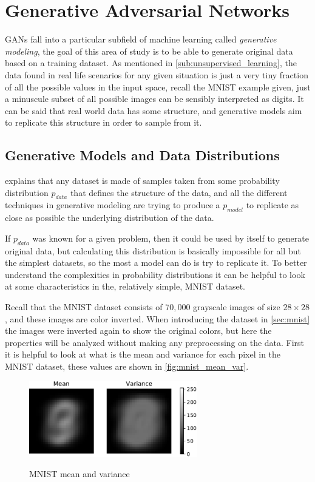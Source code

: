 \chapter{Generative Adversarial Networks} \label{cha:gans}

\acp{GAN} fall into a particular subfield of machine learning called \textit{generative modeling}, the goal of this area of study is to be able to generate original data based on a training dataset. As mentioned in \autoref{sub:unsupervised_learning}, the data found in real life scenarios for any given situation is just a very tiny fraction of all the possible values in the input space, recall the \gls{MNIST} example given, just a minuscule subset of all possible images can be sensibly interpreted as digits. It can be said that real world data has some structure, and generative models aim to replicate this structure in order to sample from it.


\section{Generative Models and Data Distributions}
\textcite{nipsGAN2017} explains that any dataset is made of samples taken from some probability distribution $p_{data}$ that defines the structure of the data, and all the different techniques in generative modeling are trying to produce a $p_{model}$ to replicate as close as possible the underlying distribution of the data.

If $p_{data}$ was known for a given problem, then it could be used by itself to generate original data, but calculating this distribution is basically impossible for all but the simplest datasets, so the most a model can do is try to replicate it. To better understand the complexities in probability distributions it can be helpful to look at some characteristics in the, relatively simple, \gls{MNIST} dataset.

Recall that the \gls{MNIST} dataset consists of $70,000$ grayscale images of size $28\times28$, and these images are color inverted. When introducing the dataset in \autoref{sec:mnist} the images were inverted again to show the original colors, but here the properties will be analyzed without making any preprocessing on the data. First it is helpful to look at what is the mean and variance for each pixel in the \gls{MNIST} dataset, these values are shown in \autoref{fig:mnist_mean_var}.
\begin{figure}[h]
    \centering
    \caption{\gls{MNIST} mean and variance}
    \includegraphics[width=0.65\textwidth]{chapters/GANs/figures/mnist_mean_var.pdf}
    \label{fig:mnist_mean_var}
\end{figure}

